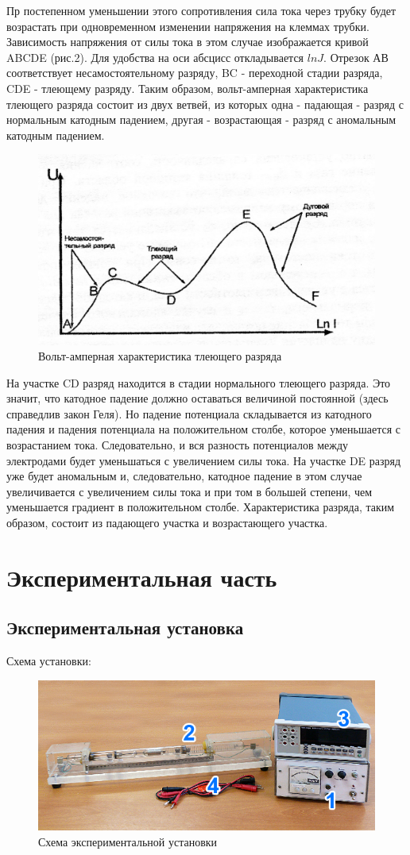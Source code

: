 Пр  постепенном уменьшении этого сопротивления сила тока через трубку будет возрастать при одновременном изменении 
напряжения на клеммах трубки. Зависимость напряжения от силы тока в этом случае изображается кривой ABCDE (рис.2). 
Для удобства на оси абсцисс откладывается $ln J$. Отрезок АВ соответствует несамостоятельному разряду, BC - переходной 
стадии разряда, CDE - тлеющему разряду. Таким образом, вольт-амперная характеристика тлеющего разряда состоит из 
двух ветвей, из которых одна - падающая - разряд с нормальным катодным падением, другая - возрастающая - разряд с 
аномальным катодным падением.

\begin{figure}[h!]
	\centering
	\includegraphics[width=0.5\linewidth]{fig/img2.jpg}
	\caption{Вольт-амперная характеристика тлеющего разряда}
	\label{fig:2}
\end{figure}

На участке CD разряд находится в стадии нормального тлеющего разряда. Это значит, что катодное падение должно оставаться 
величиной постоянной (здесь справедлив закон Геля). Но падение потенциала складывается из катодного падения и падения 
потенциала на положительном столбе, которое уменьшается с возрастанием тока. Следовательно, и вся разность потенциалов 
между электродами будет уменьшаться с увеличением силы тока. На участке DE разряд уже будет аномальным и, следовательно,
 катодное падение в этом случае увеличивается с увеличением силы тока и при том в большей степени, чем уменьшается 
 градиент в положительном столбе. Характеристика разряда, таким образом, состоит из падающего участка и возрастающего
  участка.


\section{Экспериментальная часть}
\subsection{Экспериментальная установка}
Схема установки:
\begin{figure}[h!]
	\centering
	\includegraphics[width=0.5\linewidth]{fig/img4.jpg}
	\caption{Схема экспериментальной установки}
	\label{fig:3}
\end{figure}

